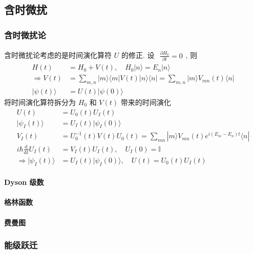 \documentclass[../../main.tex]{subfiles}
\begin{document}
\subsection{含时微扰}
\subsubsection{含时微扰论}
含时微扰论考虑的是时间演化算符 $U$ 的修正. 设 $\begin{aligned}
    \frac{\partial H_{0}}{\partial t} = 0
\end{aligned}$, 则
\begin{align*}
    H(t) &= H_{0} + V(t),\quad H_{0}|n\rangle = E_{n}|n\rangle\\
    \Rightarrow V(t) &= \sum_{m,n}|m\rangle \langle m|V(t)|n\rangle\langle n| = \sum_{m,n}|m\rangle V_{mn}(t)\langle n|\\
    |\psi(t)\rangle &= U(t)|\psi(0)\rangle 
\end{align*}
将时间演化算符拆分为 $H_{0}$ 和 $V(t)$ 带来的时间演化 
\begin{align*}
    U(t) &= U_{0}(t)U_{I}(t)\\
    |\psi_{I}(t)\rangle &= U_{I}(t)|\psi_{I}(0)\rangle\\
    V_{I}(t) &= U_{0}^{-1}(t)V(t)U_{0}(t) = \sum_{mn}|m\rangle V_{mn}(t) e^{i(E_{m}-E_{n})t}\langle n|\\
    i\hbar\frac{\mathrm{d}}{\mathrm{d}t}U_{I}(t) &= V_{I}(t)U_{I}(t),\quad U_{I}(0) = \mathbb{I}\\
    \Rightarrow |\psi_{I}(t)\rangle &= U_{I}(t)|\psi_{I}(0)\rangle, \quad U(t) = U_{0}(t)U_{I}(t)
\end{align*}
\paragraph{Dyson 级数}
\paragraph{格林函数}
\paragraph{费曼图}
\subsubsection{能级跃迁}
\end{document}
